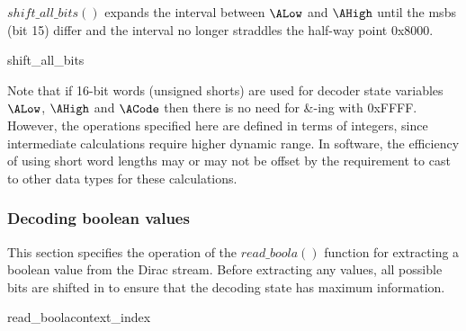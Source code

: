 $shift\_all\_bits()$ expands the interval between $\ALow$ and $\AHigh$
until the msbs (bit 15) differ and the interval no longer
straddles the half-way point 0x8000.

\begin{pseudo}{shift\_all\_bits}{}
\bsEND
{}
\bsEND
\end{pseudo}

\begin{informative}
Note that if 16-bit words (unsigned shorts) are used for decoder state variables $\ALow$,
 $\AHigh$ and $\ACode$ then there is no need for {\&}-ing with 0xFFFF. However, the 
operations specified here are defined in terms of integers, since intermediate calculations
 require higher dynamic range. In software, the efficiency of using short word lengths may
or may not be offset by the requirement to cast to other data types for these calculations.
\end{informative}

\subsubsection{Decoding boolean values}

\label{arithreadbool}

This section specifies the operation of the $read\_boola()$ function
for extracting a boolean value from the Dirac stream. Before extracting
any values, all possible bits are shifted in to ensure that the decoding
state has maximum information.

\begin{pseudo}{read\_boola}{context\_index}
\bsELSE
\bsEND
{}
\bsEND
{}
\end{pseudo}

